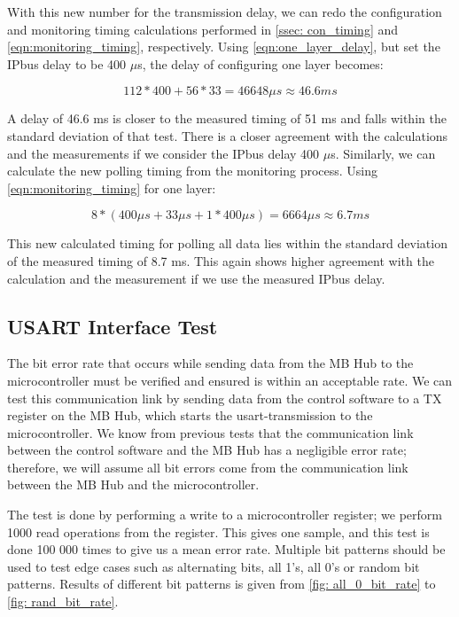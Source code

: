 \documentclass[main.tex]{subfiles}
\begin{document}
With this new number for the transmission delay, we can redo the configuration and monitoring timing calculations performed in \autoref{ssec: con_timing} and \autoref{eqn:monitoring_timing}, respectively. Using \autoref{eqn:one_layer_delay}, but set the IPbus delay to be 400 $\mu$s, the delay of configuring one layer becomes:

\begin{equation} \label{eqn:new_one_layer_delay}
112 * 400 + 56*33 =  46648\mu s \approx 46.6 ms
\end{equation}

A delay of 46.6 ms is closer to the measured timing of 51 ms and falls within the standard deviation of that test. There is a closer agreement with the calculations and the measurements if we consider the IPbus delay 400 $\mu$s. Similarly, we can calculate the new polling timing from the monitoring process. Using \autoref{eqn:monitoring_timing} for one layer:

\begin{equation} \label{eqn:new_monitoring_timing}
8*(400\mu s + 33 \mu s + 1*400\mu s) = 6664 \mu s \approx 6.7 ms
\end{equation}

This new calculated timing for polling all data lies within the standard deviation of the measured timing of 8.7 ms. This again shows higher agreement with the calculation and the measurement if we use the measured IPbus delay.



\subsection{USART Interface Test}

\label{ssec: bit_error}
The bit error rate that occurs while sending data from the MB Hub to the microcontroller must be verified and ensured is within an acceptable rate. We can test this communication link by sending data from the control software to a TX register on the MB Hub, which starts the \gls{usart}-transmission to the microcontroller. We know from previous tests that the communication link between the control software and the MB Hub has a negligible error rate; therefore, we will assume all bit errors come from the communication link between the MB Hub and the microcontroller.

The test is done by performing a write to a microcontroller register; we perform 1000 read operations from the register. This gives one sample, and this test is done 100 000 times to give us a mean error rate. Multiple bit patterns should be used to test edge cases such as alternating bits, all 1's, all 0's or random bit patterns. Results of different bit patterns is given from \autoref{fig: all_0_bit_rate} to \ref{fig: rand_bit_rate}.
\end{document}
